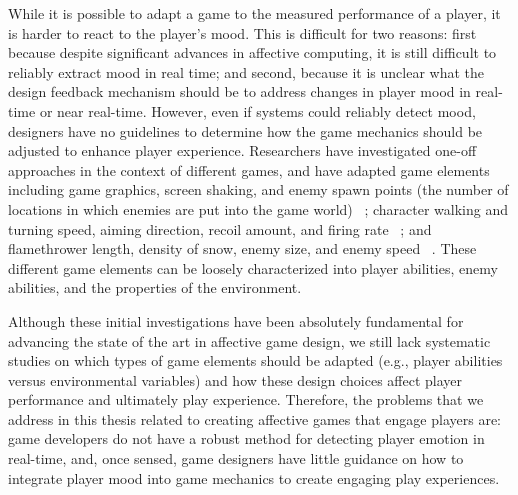 While it is possible to adapt a game to the measured performance of a player, it is harder to react to the player's mood. This is difficult for two reasons: first because despite significant advances in affective computing, it is still difficult to reliably extract mood in real time; and second, because it is unclear what the design feedback mechanism should be to address changes in player mood in real-time or near real-time. However, even if systems could reliably detect mood, designers have no guidelines to determine how the game mechanics should be adjusted to enhance player experience. Researchers have investigated one-off approaches in the context of different games, and have adapted game elements including game graphics, screen shaking, and enemy spawn points (the number of locations in which enemies are put into the game world) ~\cite{dekker2007please}; character walking and turning speed, aiming direction, recoil amount, and firing rate ~\cite{epp2011identifying}; and flamethrower length, density of snow, enemy size, and enemy speed ~\cite{nacke2011biofeedback}. These different game elements can be loosely characterized into player abilities, enemy abilities, and the properties of the environment.

Although these initial investigations have been absolutely fundamental for advancing the state of the art in affective game design, we still lack systematic studies on which types of game elements should be adapted (e.g., player abilities versus environmental variables) and how these design choices affect player performance and ultimately play experience. Therefore, the problems that we address in this thesis related to creating affective games that engage players are: game developers do not have a robust method for detecting player emotion in real-time, and, once sensed, game designers have little guidance on how to integrate player mood into game mechanics to create engaging play experiences.

